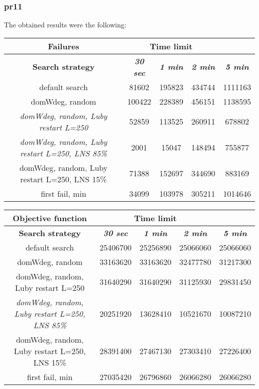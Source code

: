 \subsubsection{pr11}
The obtained results were the following:
{
\renewcommand{\arraystretch}{2}
\begin{longtable}[h]{| c | c | c | c | c |}
    \hline
    \textbf{Failures} & \multicolumn{3}{c}{Time limit} & \\
    \hline
    \textbf{Search strategy} & \textbf{\textit{30 sec}} & \textbf{\textit{1 min}} & \textbf{\textit{2 min}} & \textbf{\textit{5 min}} \\
    \hline
    \endhead
    default search                                         &  81602 & 195823 & 434744 & 1111163 \\
    \hline
    domWdeg, random                                        & 100422 & 228389 & 456151 & 1138595 \\
    \hline
    \textit{domWdeg, random, Luby restart L=250}           &  52859 & 113525 & 260911 &  678802 \\
    \hline
    \textit{domWdeg, random, Luby restart L=250, LNS 85\%} &   2001 &  15047 & 148494 &  755877 \\
    \hline
    domWdeg, random, Luby restart L=250, LNS 15\%          &  71388 & 152697 & 344690 &  883169 \\
    \hline
    first fail, min                                        &  34099 & 103978 & 305211 & 1014646 \\
    \hline
\end{longtable}
}

{
\renewcommand{\arraystretch}{2}
\begin{longtable}[h]{| c | c | c | c | c |}
    \hline
    \textbf{Objective function} & \multicolumn{3}{c}{Time limit} & \\
    \hline
    \textbf{Search strategy} & \textbf{\textit{30 sec}} & \textbf{\textit{1 min}} & \textbf{\textit{2 min}} & \textbf{\textit{5 min}} \\
    \hline
    \endhead
    default search                                         & 25406700 & 25256890 & 25066060 & 25066060 \\
    \hline
    domWdeg, random                                        & 33163620 & 33163620 & 32477780 & 31217300 \\
    \hline
    domWdeg, random, Luby restart L=250                    & 31640290 & 31640290 & 31125930 & 29831450 \\
    \hline
    \textit{domWdeg, random, Luby restart L=250, LNS 85\%} & 20251920 & 13628410 & 10521670 & 10087210 \\
    \hline
    domWdeg, random, Luby restart L=250, LNS 15\%          & 28391400 & 27467130 & 27303410 & 27226400 \\
    \hline
    first fail, min                                        & 27035420 & 26796860 & 26066280 & 26066280 \\
    \hline
\end{longtable}
}